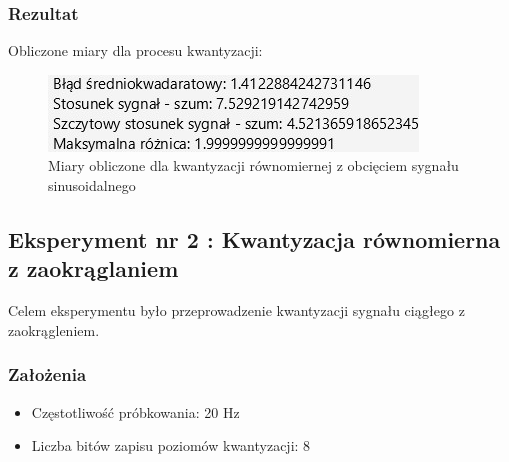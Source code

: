 \documentclass[12pt]{article}
\begin{document}
\subsubsection{Rezultat}
Obliczone miary dla procesu kwantyzacji:
\begin{figure}[H]
    \centering
	\includegraphics[width=\linewidth]{wyniki_kwantyzacja_z_obcieciem.jpg}
    \caption{Miary obliczone dla kwantyzacji równomiernej z obcięciem sygnału sinusoidalnego}
    \label{Wartości dla eksperymentu 1}
\end{figure}




\newpage
\subsection{Eksperyment nr 2 : Kwantyzacja równomierna z zaokrąglaniem}

Celem eksperymentu było przeprowadzenie kwantyzacji sygnału ciągłego z zaokrągleniem.

\subsubsection{Założenia}

\begin{itemize}
	\item Częstotliwość próbkowania: 20 Hz
	\item Liczba bitów zapisu poziomów kwantyzacji: 8
\end{itemize}
\end{document}
